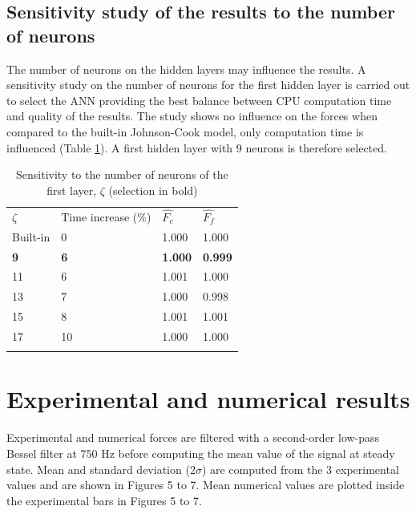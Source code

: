 \documentclass[final,5p,times,twocolumn]{elsarticle}
\begin{document}
\subsection{Sensitivity study of the results to the number of neurons}
\label{subsec:nberneu}

The number of neurons on the hidden layers may influence the results. A sensitivity study on the number of neurons for the first hidden layer is carried out to select the ANN providing the best balance between CPU computation time and quality of the results. The study shows no influence on the forces when compared to the built-in Johnson-Cook model, only computation time is influenced (Table \ref{tab:NbNeurons}). A first hidden layer with 9 neurons is therefore selected.

%
\begin{table}[!h]
\begin{center}
\caption{\label{tab:NbNeurons} Sensitivity to the number of neurons of the first layer, $\zeta$
(selection in bold)}
\begin{tabular}{llll}
\hline\noalign{\smallskip}
$\zeta$  & Time increase (\%) & $\hat{F_c}$ & $\hat{F_f}$\\
\noalign{\smallskip}\hline\noalign{\smallskip}
Built-in & 0 & 1.000 & 1.000\\
\textbf{9} & \textbf{6} & \textbf{1.000} & \textbf{0.999}\\
11 & 6 & 1.001 & 1.000\\
13 & 7 & 1.000 & 0.998\\
15 & 8 & 1.001 & 1.001\\
17 & 10 & 1.000 & 1.000\\
\noalign{\smallskip}\hline
\end{tabular}
\end{center}
\end{table}
%

\section{Experimental and numerical results\label{sec:ExpNumResults}}
\label{Results}

Experimental and numerical forces are filtered with a second-order low-pass Bessel filter at 750 Hz before computing the mean value of the signal at steady state. Mean and standard deviation ($2\sigma$) are computed from the 3 experimental values and are shown in Figures 5 to 7. Mean numerical values are plotted inside the experimental bars in Figures 5 to 7.
\end{document}
